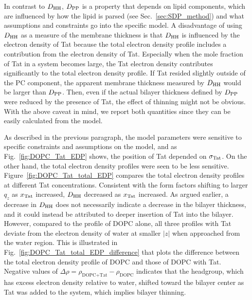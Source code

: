 In contrast to $D_\textrm{HH}$, $D_\textrm{PP}$ is a property that
depends on lipid components, which are influenced by how the lipid is parsed 
(see Sec.~\ref{sec:SDP_method})
and what assumptions and constraints go into the specific model.
A disadvantage of using $D_\textrm{HH}$ as a measure of the membrane thickness is
that $D_\textrm{HH}$ is influenced by the electron density of Tat because 
the total electron density profile includes a contribution from the electron density of Tat. 
Especially when the mole fraction of Tat in a system becomes large, 
the Tat electron density contributes significantly to the total electron 
density profile. If Tat resided slightly 
outside of the PC component, the apparent membrane thickness measured by $D_\textrm{HH}$
would be larger than $D_\textrm{PP}$. Then, even if the actual bilayer thickness defined by $D_\textrm{PP}$ 
were reduced by the presence of Tat, the effect of thinning might not be obvious. 
With the above caveat in mind, we report both quantities 
since they can be easily calculated from the model.

As described in the previous paragraph, the model parameters were sensitive to 
specific constraints and assumptions on the model, and as Fig.~\ref{fig:DOPC_Tat_EDP}
shows, the position of Tat depended on $\sigma_\textrm{Tat}$. On the other hand,
the total electron density profiles were seen to be less sensitive. 
Figure~\ref{fig:DOPC_Tat_total_EDP} compares the total electron density profiles
at different Tat concentrations. Consistent with the form factors shifting 
to larger $q_z$ as $x_\textrm{Tat}$ increased, $D_\textrm{HH}$ decreased as $x_\textrm{Tat}$ increased.
As argued earlier, a decrease in $D_\textrm{HH}$ does not necessarily indicate a decrease
in the bilayer thickness, and it could instead be attributed to deeper insertion
of Tat into the bilayer. However, compared to the profile of DOPC alone,
all three profiles with Tat deviate from the electron density of water 
at smaller $|z|$ when approached from the water region. This is illustrated 
in Fig.~\ref{fig:DOPC_Tat_total_EDP_difference} that plots the difference 
between the total electron density profile of DOPC and those of DOPC with Tat.
Negative values of $\Delta\rho = \rho_\text{DOPC+Tat} - \rho_\text{DOPC}$
indicates that the headgroup, which has excess electron density relative to
water, shifted toward the bilayer center as Tat was added to the system,
which implies bilayer thinning. 

